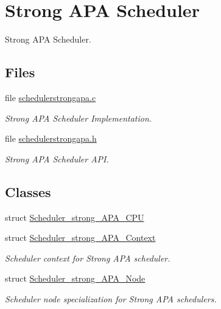 \hypertarget{group__RTEMSScoreSchedulerStrongAPA}{}\section{Strong A\+PA Scheduler}
\label{group__RTEMSScoreSchedulerStrongAPA}


Strong A\+PA Scheduler.  


\subsection*{Files}
\begin{DoxyCompactItemize}
\item 
file \hyperlink{schedulerstrongapa_8c}{schedulerstrongapa.\+c}
\begin{DoxyCompactList}\small\item\em Strong A\+PA Scheduler Implementation. \end{DoxyCompactList}\item 
file \hyperlink{schedulerstrongapa_8h}{schedulerstrongapa.\+h}
\begin{DoxyCompactList}\small\item\em Strong A\+PA Scheduler A\+PI. \end{DoxyCompactList}\end{DoxyCompactItemize}
\subsection*{Classes}
\begin{DoxyCompactItemize}
\item 
struct \hyperlink{structScheduler__strong__APA__CPU}{Scheduler\+\_\+strong\+\_\+\+A\+P\+A\+\_\+\+C\+PU}
\item 
struct \hyperlink{structScheduler__strong__APA__Context}{Scheduler\+\_\+strong\+\_\+\+A\+P\+A\+\_\+\+Context}
\begin{DoxyCompactList}\small\item\em Scheduler context for Strong A\+PA scheduler. \end{DoxyCompactList}\item 
struct \hyperlink{structScheduler__strong__APA__Node}{Scheduler\+\_\+strong\+\_\+\+A\+P\+A\+\_\+\+Node}
\begin{DoxyCompactList}\small\item\em Scheduler node specialization for Strong A\+PA schedulers. \end{DoxyCompactList}\end{DoxyCompactItemize}
